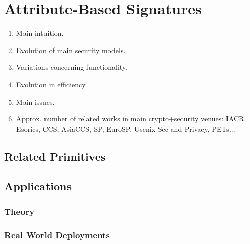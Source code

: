 \section{Attribute-Based Signatures}
\label{sec:abs}

\begin{enumerate}
\item Main intuition.
\item Evolution of main security models.
\item Variations concerning functionality.
\item Evolution in efficiency.
\item Main issues.
\item Approx. number of related works in main crypto+security venues: IACR,
  Esorics, CCS, AsiaCCS, SP, EuroSP, Usenix Sec and Privacy, PETs...
\end{enumerate}

\subsection{Related Primitives}

\subsection{Applications}
\label{ssec:absapplication}

\subsubsection{Theory}
\label{sssec:abstheoryapp}

\subsubsection{Real World Deployments}
\label{sssec:absrwdeploy}

